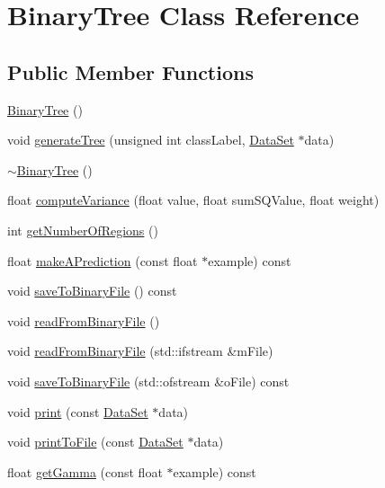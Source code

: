 \hypertarget{class_binary_tree}{}\section{Binary\+Tree Class Reference}
\label{class_binary_tree}
\subsection*{Public Member Functions}
\begin{DoxyCompactItemize}
\item 
\hyperlink{class_binary_tree_adf45bce605436b26c353b87e27bffe50}{Binary\+Tree} ()
\item 
void \hyperlink{class_binary_tree_a6473cf23a1a9193bd73f4f2eacae33bb}{generate\+Tree} (unsigned int class\+Label, \hyperlink{class_data_set}{Data\+Set} $\ast$data)
\item 
\hyperlink{class_binary_tree_a48c23a22a8400765d099e0e6fcebc236}{$\sim$\+Binary\+Tree} ()
\item 
float \hyperlink{class_binary_tree_a03a629b383d095cb981ed30eaaa0268f}{compute\+Variance} (float value, float sum\+S\+Q\+Value, float weight)
\item 
int \hyperlink{class_binary_tree_a0e9333ef74d76d2f125d8f76e77c033d}{get\+Number\+Of\+Regions} ()
\item 
float \hyperlink{class_binary_tree_a389a58e86e9e8a61e00210e7457287e1}{make\+A\+Prediction} (const float $\ast$example) const 
\item 
void \hyperlink{class_binary_tree_a3f8ff4e8cf4a8daf36168e155ddf1421}{save\+To\+Binary\+File} () const 
\item 
void \hyperlink{class_binary_tree_a5224afb82b0e908f0ea7acf3b02f0bd4}{read\+From\+Binary\+File} ()
\item 
void \hyperlink{class_binary_tree_af1a88ca94296d5df3787612ab5dcb705}{read\+From\+Binary\+File} (std\+::ifstream \&m\+File)
\item 
void \hyperlink{class_binary_tree_a6744400cd870d287b2e6bf6e54b0f987}{save\+To\+Binary\+File} (std\+::ofstream \&o\+File) const 
\item 
void \hyperlink{class_binary_tree_ad8f6b1b5cb0b9098199f583868afe297}{print} (const \hyperlink{class_data_set}{Data\+Set} $\ast$data)
\item 
void \hyperlink{class_binary_tree_a1cd6d1dba0424abae2cf13c3facf59c9}{print\+To\+File} (const \hyperlink{class_data_set}{Data\+Set} $\ast$data)
\item 
float \hyperlink{class_binary_tree_a5cb73b30134468ab29509dbf0f1786d2}{get\+Gamma} (const float $\ast$example) const 
\end{DoxyCompactItemize}


